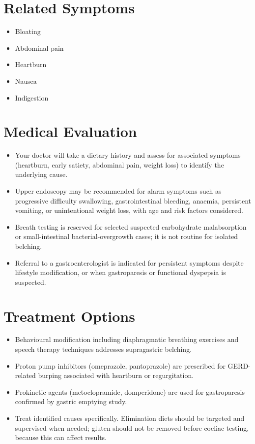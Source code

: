 \section*{Related Symptoms}
\begin{itemize}
 \item Bloating
 \item Abdominal pain
 \item Heartburn
 \item Nausea
 \item Indigestion
\end{itemize}

\section*{Medical Evaluation}
\begin{itemize}
 \item Your doctor will take a dietary history and assess for associated symptoms (heartburn, early satiety, abdominal pain, weight loss) to identify the underlying cause.
 \item Upper endoscopy may be recommended for alarm symptoms such as progressive difficulty swallowing, gastrointestinal bleeding, anaemia, persistent vomiting, or unintentional weight loss, with age and risk factors considered.
 \item Breath testing is reserved for selected suspected carbohydrate malabsorption or small-intestinal bacterial-overgrowth cases; it is not routine for isolated belching.
 \item Referral to a gastroenterologist is indicated for persistent symptoms despite lifestyle modification, or when gastroparesis or functional dyspepsia is suspected.
\end{itemize}

\section*{Treatment Options}
\begin{itemize}
 \item Behavioural modification including diaphragmatic breathing exercises and speech therapy techniques addresses supragastric belching.
 \item Proton pump inhibitors (omeprazole, pantoprazole) are prescribed for GERD-related burping associated with heartburn or regurgitation.
 \item Prokinetic agents (metoclopramide, domperidone) are used for gastroparesis confirmed by gastric emptying study.
 \item Treat identified causes specifically. Elimination diets should be targeted and supervised when needed; gluten should not be removed before coeliac testing, because this can affect results.
\end{itemize}


